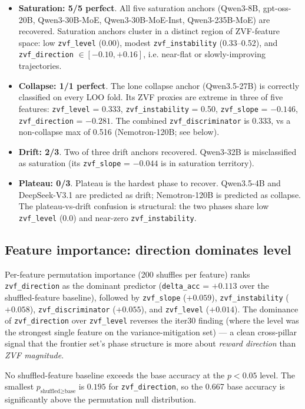 \documentclass{article}
\begin{document}
\begin{itemize}
\item \textbf{Saturation: 5/5 perfect}. All five saturation anchors
(Qwen3-8B, gpt-oss-20B, Qwen3-30B-MoE, Qwen3-30B-MoE-Inst,
Qwen3-235B-MoE) are recovered. Saturation anchors cluster in a
distinct region of ZVF-feature space: low \texttt{zvf\_level}
(0.00), modest \texttt{zvf\_instability} (0.33--0.52), and
\texttt{zvf\_direction} $\in [-0.10, +0.16]$, i.e. near-flat or
slowly-improving trajectories.
\item \textbf{Collapse: 1/1 perfect}. The lone collapse anchor
(Qwen3.5-27B) is correctly classified on every LOO fold. Its
ZVF proxies are extreme in three of five features:
\texttt{zvf\_level} = 0.333, \texttt{zvf\_instability} = 0.50,
\texttt{zvf\_slope} = $-0.146$, \texttt{zvf\_direction} = $-0.281$.
The combined \texttt{zvf\_discriminator} is 0.333, vs a
non-collapse max of 0.516 (Nemotron-120B; see below).
\item \textbf{Drift: 2/3}. Two of three drift anchors recovered.
Qwen3-32B is misclassified as saturation (its \texttt{zvf\_slope}
= $-0.044$ is in saturation territory).
\item \textbf{Plateau: 0/3}. Plateau is the hardest phase to
recover. Qwen3.5-4B and DeepSeek-V3.1 are predicted as drift;
Nemotron-120B is predicted as collapse. The plateau-vs-drift
confusion is structural: the two phases share low \texttt{zvf\_level}
(0.0) and near-zero \texttt{zvf\_instability}.
\end{itemize}

\subsection{Feature importance: direction dominates level}
\label{sec:zvf-iter34-importance}

Per-feature permutation importance (200 shuffles per feature)
ranks \texttt{zvf\_direction} as the dominant predictor
(\texttt{delta\_acc} = $+0.113$ over the shuffled-feature baseline),
followed by \texttt{zvf\_slope} ($+0.059$), \texttt{zvf\_instability}
($+0.058$), \texttt{zvf\_discriminator} ($+0.055$), and
\texttt{zvf\_level} ($+0.014$). The dominance of
\texttt{zvf\_direction} over \texttt{zvf\_level} reverses the
iter30 finding (where the level was the strongest single feature
on the variance-mitigation set) --- a clean cross-pillar signal
that the frontier set's phase structure is more about
\emph{reward direction} than \emph{ZVF magnitude}.

No shuffled-feature baseline exceeds the base accuracy at the
$p < 0.05$ level. The smallest $p_{\text{shuffled} \ge \text{base}}$
is $0.195$ for \texttt{zvf\_direction}, so the 0.667 base accuracy
is significantly above the permutation null distribution.
\end{document}

